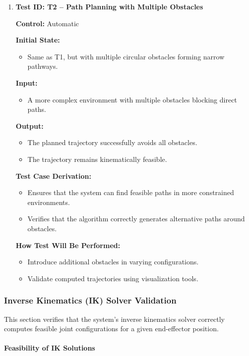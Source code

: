 \documentclass[12pt, titlepage]{article}
\begin{document}
\begin{enumerate}
\item \textbf{Test ID: T2 -- Path Planning with Multiple Obstacles}  

\textbf{Control:} Automatic  

\textbf{Initial State:}  
\begin{itemize}
    \item Same as T1, but with multiple circular obstacles forming narrow pathways.
\end{itemize}

\textbf{Input:}  
\begin{itemize}
    \item A more complex environment with multiple obstacles blocking direct paths.
\end{itemize}

\textbf{Output:}  
\begin{itemize}
    \item The planned trajectory successfully avoids all obstacles.
    \item The trajectory remains kinematically feasible.
\end{itemize}

\textbf{Test Case Derivation:}  
\begin{itemize}
    \item Ensures that the system can find feasible paths in more constrained environments.
    \item Verifies that the algorithm correctly generates alternative paths around obstacles.
\end{itemize}

\textbf{How Test Will Be Performed:}  
\begin{itemize}
    \item Introduce additional obstacles in varying configurations.
    \item Validate computed trajectories using visualization tools.
\end{itemize}

\end{enumerate}

\subsubsection{Inverse Kinematics (IK) Solver Validation}

This section verifies that the system's inverse kinematics solver correctly computes feasible joint configurations for a given end-effector position.

\paragraph{Feasibility of IK Solutions}
\end{document}
